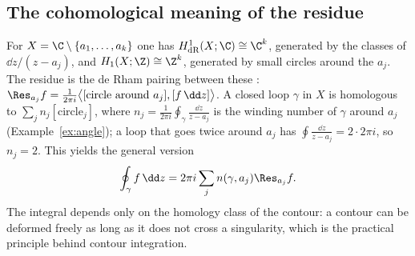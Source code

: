 \subsection{The cohomological meaning of the residue}\label{sec:rescohom}

For $X=\C\setminus\{a_1,\dots,a_k\}$ one has $H^1_{\mathrm{dR}}(X;\C)\cong\C^k$, generated by the classes of $\dd z/(z-a_j)$, and $H_1(X;\Z)\cong\Z^k$, generated by small circles around the $a_j$. The residue is the de Rham pairing between these \cite{BottTu}:
$\Res_{a_j}f=\frac1{2\pi i}\bigl\langle[\text{circle around }a_j],[f\,\dd z]\bigr\rangle$.
A closed loop $\gamma$ in $X$ is homologous to $\sum_jn_j[\text{circle}_j]$, where $n_j=\frac1{2\pi i}\oint_\gamma\frac{\dd z}{z-a_j}$ is the winding number of $\gamma$ around $a_j$ (Example~\ref{ex:angle}); \eg a loop that goes twice around $a_j$ has $\oint\frac{\dd z}{z-a_j}=2\cdot2\pi i$, so $n_j=2$. This yields the general version
\begin{equation}\label{eq:winding}
\oint_\gamma f\,\dd z=2\pi i\sum_jn(\gamma,a_j)\Res_{a_j}f .
\end{equation}
The integral depends only on the homology class of the contour: a contour can be deformed freely as long as it does not cross a singularity, which is the practical principle behind contour integration.
